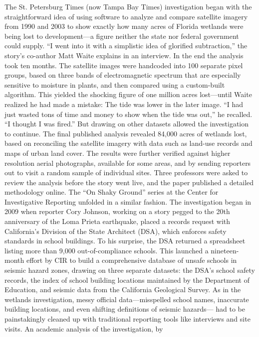 The St. Petersburg Times (now Tampa Bay Times) investigation began with
the straightforward idea of using software to analyze and compare satellite
imagery from 1990 and 2003 to show exactly how many acres of Florida
wetlands were being lost to development—a figure neither the state nor federal
government could supply. ``I went into it with a simplistic idea of glorified
subtraction,'' the story's co-author Matt Waite explains in an interview.
In the end the analysis took ten months. The satellite images were handcoded
into 100 separate pixel groups, based on three bands of electromagnetic
spectrum that are especially sensitive to moisture in plants, and then
compared using a custom-built algorithm. This yielded the shocking figure
of one million acres lost—until Waite realized he had made a mistake: The
tide was lower in the later image. ``I had just wasted tons of time and money
to show when the tide was out,'' he recalled. ``I thought I was fired.'' But
drawing on other datasets allowed the investigation to continue. The final
published analysis revealed 84,000 acres of wetlands lost, based on reconciling
the satellite imagery with data such as land-use records and maps of
urban land cover. The results were further verified against higher resolution
aerial photographs, available for some areas, and by sending reporters out
to visit a random sample of individual sites. Three professors were asked
to review the analysis before the story went live, and the paper published a
detailed methodology online.
The ``On Shaky Ground'' series at the Center for Investigative Reporting
unfolded in a similar fashion. The investigation began in 2009 when reporter
Cory Johnson, working on a story pegged to the 20th anniversary of the
Loma Prieta earthquake, placed a records request with California's Division
of the State Architect (DSA), which enforces safety standards in school
buildings. To his surprise, the DSA returned a spreadsheet listing more than 9,000 out-of-compliance schools. This launched a nineteen-month effort by
CIR to build a comprehensive database of unsafe schools in seismic hazard
zones, drawing on three separate datasets: the DSA's school safety records,
the index of school building locations maintained by the Department of
Education, and seismic data from the California Geological Survey. As in
the wetlands investigation, messy official data—misspelled school names,
inaccurate building locations, and even shifting definitions of seismic hazards—
had to be painstakingly cleaned up with traditional reporting tools
like interviews and site visits. An academic analysis of the investigation, by
